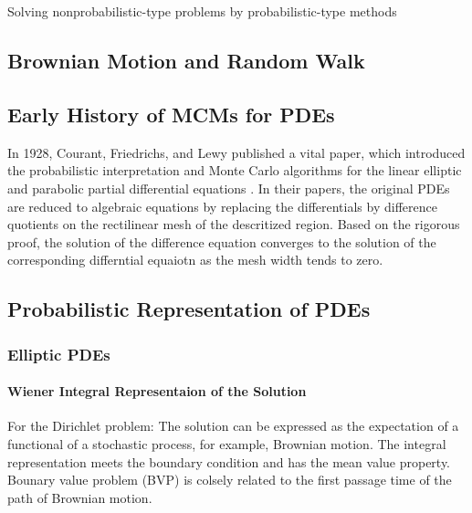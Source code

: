 \section{}



Solving nonprobabilistic-type problems by probabilistic-type methods



\subsection{Brownian Motion and Random Walk}


\subsection{Early History of MCMs for PDEs}

In 1928, Courant, Friedrichs, and Lewy published a vital paper, which
introduced the probabilistic interpretation and Monte Carlo algorithms
for the linear elliptic and parabolic partial differential equations
\cite{courant1928partiellen}. In their papers, the original PDEs are
reduced to algebraic equations by replacing the differentials by
difference quotients on the rectilinear mesh of the descritized
region. Based on the rigorous proof, the solution of the difference
equation converges to the solution of the corresponding differntial
equaiotn as the mesh width tends to zero.

\subsection{Probabilistic Representation of PDEs}

\subsubsection{Elliptic PDEs}

\paragraph{Wiener Integral Representaion of the Solution}

For the Dirichlet problem: The solution can be expressed as the
expectation of a functional of a stochastic process, for example,
Brownian motion. The integral representation meets the boundary
condition and has the mean value property. Bounary value problem (BVP) is
colsely related to the first passage time of the path of Brownian
motion. 


